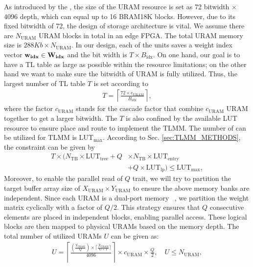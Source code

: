 \documentclass[sigconf]{acmart}
\begin{document}
As introduced by the \cite{AMD_UG573_ultrascale_memory}, the size of the URAM resource is set as 72 bitwidth $\times$ 4096 depth, which can equal up to 16 BRAM18K blocks. However, due to its fixed bitwidth of 72, the design of storage architecture is vital. We assume there are $N_{\text{URAM}}$ URAM blocks in total in an edge FPGA. The total URAM memory size is $288Kb \times N_{\text{URAM}}$. In our design, each of the units saves a weight index vector $\bf{w}_{idx} \in \bf{W}_{idx}$ and the bit width is $T \times B_{\text{idx}}$. On one hand, our goal is to have a TL table as large as possible within the resource limitations; on the other hand we want to make sure the bitwidth of URAM is fully utilized. Thus, the largest number of TL table $T$ is set according to 
\begin{align}
T = \left\lceil \frac{72 \times c_{\text{URAM}}}{B_{\text{idx}}} \right\rceil
\label{eq:table},
\end{align}
where the factor $c_{\text{URAM}}$ stands for the cascade factor that combine $c_{\text{URAM}}$ URAM together to get a larger bitwidth. The $T$ is also confined by the available LUT resource to ensure place and route to implement the TLMM. The number of  can be utilized for TLMM is $\text{LUT}_{\text{max}}$. According to Sec. \ref{sec:TLMM_METHODS}, the constraint can be given by
\begin{equation}
\begin{split}
   T \times (N_{\text{TB}} \times \text{LUT}_{\text{tree}} + Q &\times N_{\text{TB}} \times 
   \text{LUT}_{\text{entry}} \\&
    + Q \times \text{LUT}_{\text{lp}} )  \leq \text{LUT}_{\text{max}},
\end{split}
\end{equation}
Moreover, to enable the parallel read of $Q$  trait, we will try to partition the target buffer array size of $X_{\text{URAM}} \times Y_{\text{URAM}}$ to ensure the above memory banks are independent.
Since each URAM is a dual-port memory ~\cite{AMD_UG573_ultrascale_memory}, we partition the weight matrix cyclically with a factor of $Q/2$. This strategy ensures that $Q$ consecutive elements are placed in independent blocks, enabling parallel access. 
These logical blocks are then mapped to physical URAMs based on the memory depth. The total number of utilized URAMs $U$ can be given as:
\begin{align}
U = \left\lceil \frac{(\frac {Y_{\text{URAM}}}{  Q} )\times \lceil \frac{X_{\text{URAM}}}{G \times T}\rceil}{4096}  \right\rceil  \times c_{\text{URAM}}  \times \frac{Q}{2}, \quad U \leq N_{\text{URAM}},
\end{align}
\end{document}
